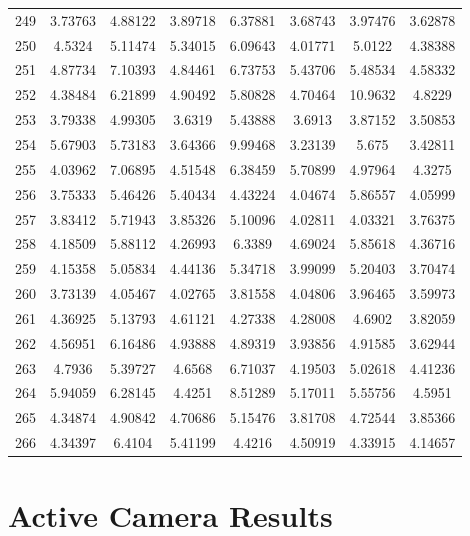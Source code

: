\begin{center}
\begin{longtable}{cccccccc}
249 & 3.73763 & 4.88122 & 3.89718 & 6.37881 & 3.68743 & 3.97476 & 3.62878\\
250 & 4.5324 & 5.11474 & 5.34015 & 6.09643 & 4.01771 & 5.0122 & 4.38388\\
251 & 4.87734 & 7.10393 & 4.84461 & 6.73753 & 5.43706 & 5.48534 & 4.58332\\
252 & 4.38484 & 6.21899 & 4.90492 & 5.80828 & 4.70464 & 10.9632 & 4.8229\\
253 & 3.79338 & 4.99305 & 3.6319 & 5.43888 & 3.6913 & 3.87152 & 3.50853\\
254 & 5.67903 & 5.73183 & 3.64366 & 9.99468 & 3.23139 & 5.675 & 3.42811\\
255 & 4.03962 & 7.06895 & 4.51548 & 6.38459 & 5.70899 & 4.97964 & 4.3275\\
256 & 3.75333 & 5.46426 & 5.40434 & 4.43224 & 4.04674 & 5.86557 & 4.05999\\
257 & 3.83412 & 5.71943 & 3.85326 & 5.10096 & 4.02811 & 4.03321 & 3.76375\\
258 & 4.18509 & 5.88112 & 4.26993 & 6.3389 & 4.69024 & 5.85618 & 4.36716\\
259 & 4.15358 & 5.05834 & 4.44136 & 5.34718 & 3.99099 & 5.20403 & 3.70474\\
260 & 3.73139 & 4.05467 & 4.02765 & 3.81558 & 4.04806 & 3.96465 & 3.59973\\
261 & 4.36925 & 5.13793 & 4.61121 & 4.27338 & 4.28008 & 4.6902 & 3.82059\\
262 & 4.56951 & 6.16486 & 4.93888 & 4.89319 & 3.93856 & 4.91585 & 3.62944\\
263 & 4.7936 & 5.39727 & 4.6568 & 6.71037 & 4.19503 & 5.02618 & 4.41236\\
264 & 5.94059 & 6.28145 & 4.4251 & 8.51289 & 5.17011 & 5.55756 & 4.5951\\
265 & 4.34874 & 4.90842 & 4.70686 & 5.15476 & 3.81708 & 4.72544 & 3.85366\\
266 & 4.34397 & 6.4104 & 5.41199 & 4.4216 & 4.50919 & 4.33915 & 4.14657\\
\end{longtable}
\end{center} 

\section{Active Camera Results}
\label{ActiveResultsRaw}

